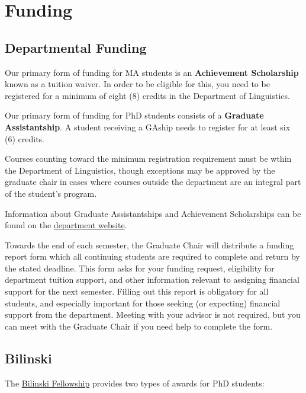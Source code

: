 \documentclass[
]{book}
\begin{document}
\hypertarget{funding}{%
\chapter{Funding}\label{funding}}

\hypertarget{departmental-funding}{%
\section{Departmental Funding}\label{departmental-funding}}

Our primary form of funding for MA students is an \textbf{Achievement Scholarship} known as a tuition waiver. In order to be eligible for this, you need to be registered for a minimum of eight (8) credits in the Department of Linguistics.

Our primary form of funding for PhD students consists of a \textbf{Graduate Assistantship}. A student receiving a GAship needs to register for at least six (6) credits.

Courses counting toward the minimum registration requirement must be wthin the Department of Linguistics, though exceptions may be approved by the graduate chair in cases where courses outside the department are an integral part of the student's program.

Information about Graduate Assistantships and Achievement Scholarships can be found on the \href{http://ling.hawaii.edu/degree-programs/funding/}{department website}.

Towards the end of each semester, the Graduate Chair will distribute a funding report form which all continuing students are required to complete and return by the stated deadline. This form asks for your funding request, eligibility for department tuition support, and other information relevant to assigning financial support for the next semester. Filling out this report is obligatory for all students, and especially important for those seeking (or expecting) financial support from the department. Meeting with your advisor is not required, but you can meet with the Graduate Chair if you need help to complete the form.

\hypertarget{bilinski}{%
\section{Bilinski}\label{bilinski}}

The \href{http://ling.hawaii.edu/degree-programs/funding/bilinski/}{Bilinski Fellowship} provides two types of awards for PhD students:
\end{document}
